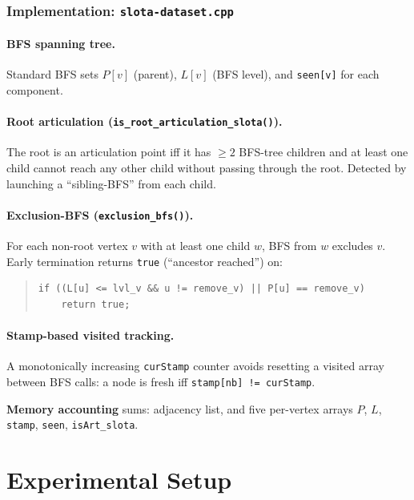 \documentclass[12pt,a4paper]{article}
\newcommand{\code}[1]{\texttt{#1}}
\begin{document}
\subsubsection{Implementation: \texttt{slota-dataset.cpp}}

\paragraph{BFS spanning tree.}
Standard BFS sets $P[v]$ (parent), $L[v]$ (BFS level), and \code{seen[v]}
for each component.

\paragraph{Root articulation (\code{is\_root\_articulation\_slota()}).}
The root is an articulation point iff it has $\geq 2$ BFS-tree children
and at least one child cannot reach any other child without passing through
the root.  Detected by launching a ``sibling-BFS'' from each child.

\paragraph{Exclusion-BFS (\code{exclusion\_bfs()}).}
For each non-root vertex $v$ with at least one child $w$, BFS from $w$
excludes $v$.  Early termination returns \texttt{true} (``ancestor
reached'') on:

\begin{quote}
\begin{verbatim}
if ((L[u] <= lvl_v && u != remove_v) || P[u] == remove_v)
    return true;
\end{verbatim}
\end{quote}

\paragraph{Stamp-based visited tracking.}
A monotonically increasing \code{curStamp} counter avoids resetting a
visited array between BFS calls: a node is fresh iff
\code{stamp[nb] != curStamp}.

\textbf{Memory accounting} sums: adjacency list, and five per-vertex
arrays $P$, $L$, \texttt{stamp}, \texttt{seen}, \texttt{isArt\_slota}.


\section{Experimental Setup}
\end{document}
